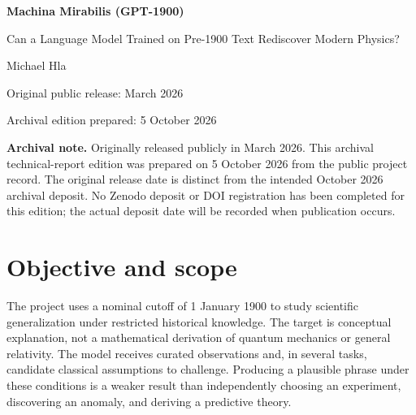 \documentclass[10pt,a4paper]{article}
\begin{document}
\begin{center}
{\LARGE\bfseries Machina Mirabilis (GPT-1900)\par}
\vspace{6pt}
{\large Can a Language Model Trained on Pre-1900 Text Rediscover Modern Physics?\par}
\vspace{9pt}
Michael Hla\par
\vspace{3pt}
Original public release: March 2026\par
Archival edition prepared: 5 October 2026
\end{center}
\begin{abstract}
Machina Mirabilis (GPT-1900) investigates whether a language model trained from scratch on historical text can generate conceptually useful explanations of observations associated with later developments in physics. The project reports a 3.3-billion-parameter transformer and approximately 22 billion tokens of filtered pre-1900 text, followed by physics midtraining, synthetic instruction tuning, and reinforcement learning with a modern language-model judge. Eight prompts probe blackbody radiation, the photoelectric effect, and thought experiments associated with relativity. Selected generations suggest discrete energy transfer or relationships between gravity and acceleration, but performance is inconsistent and often physically incorrect. Modern-model supervision, residual contamination risk, supplied experimental framing, and checkpoint selection limit conclusions about independent rediscovery. This report consolidates the original public methods and archived evaluation outputs; it reports no new training or experiments.
\end{abstract}
{\footnotesize\textbf{Archival note.} Originally released publicly in March 2026. This archival technical-report edition was prepared on 5 October 2026 from the public project record. The original release date is distinct from the intended October 2026 archival deposit. No Zenodo deposit or DOI registration has been completed for this edition; the actual deposit date will be recorded when publication occurs.\par}
\section{Objective and scope}
The project uses a nominal cutoff of 1 January 1900 to study scientific generalization under restricted historical knowledge. The target is conceptual explanation, not a mathematical derivation of quantum mechanics or general relativity. The model receives curated observations and, in several tasks, candidate classical assumptions to challenge. Producing a plausible phrase under these conditions is a weaker result than independently choosing an experiment, discovering an anomaly, and deriving a predictive theory. \cite{ref1,ref3}
\end{document}
